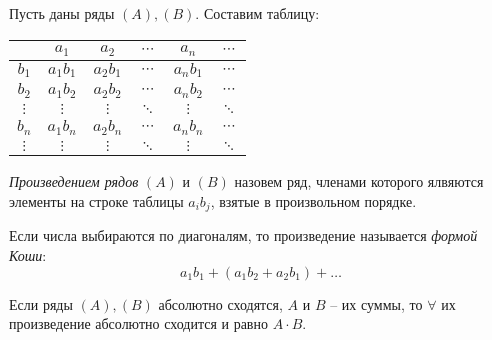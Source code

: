 \begin{note}
    Пусть даны ряды $ (A),(B) $. Составим таблицу:
    \begin{center}
        \begin{tabular}{c | c | c | c | c | c}
                     & $a_1$     & $a_2$      & $\cdots$ & $a_n$     & $\cdots$ \\
            \hline
            $b_1$    & $a_1 b_1$ & $a_2 b_1 $ & $\cdots$ & $a_n b_1$ & $\cdots$ \\
            \hline
            $b_2$    & $a_1 b_2$ & $a_2 b_2$  & $\cdots$ & $a_n b_2$ & $\cdots$ \\
            \hline
            $\vdots$ & $\vdots$  & $\vdots$   & $\ddots$ & $\vdots$  & $\ddots$ \\
            \hline
            $b_n$    & $a_1 b_n$ & $a_2 b_n$  & $\cdots$ & $a_n b_n$ & $\cdots$ \\
            \hline
            $\vdots$ & $\vdots$  & $\vdots$   & $\ddots$ & $\vdots$  & $\ddots$ \\
        \end{tabular}
    \end{center}
\end{note}

\begin{definition}
    \emph{Произведением рядов} $(A)$ и $(B)$ назовем ряд, членами которого ялвяются элементы на строке таблицы $a_ib_j$, взятые в произвольном порядке.

    Если числа выбираются по диагоналям, то произведение называется \emph{формой Коши}:
    \[
        a_1 b_1 + (a_1 b_2 + a_2 b_1) + \ldots
    \]
\end{definition}

\begin{theorem}
    Если ряды $ (A),(B) $ абсолютно сходятся, $A$ и $B$ -- их суммы, то $\forall$ их произведение абсолютно сходится и равно $A \cdot B$.
\end{theorem}

